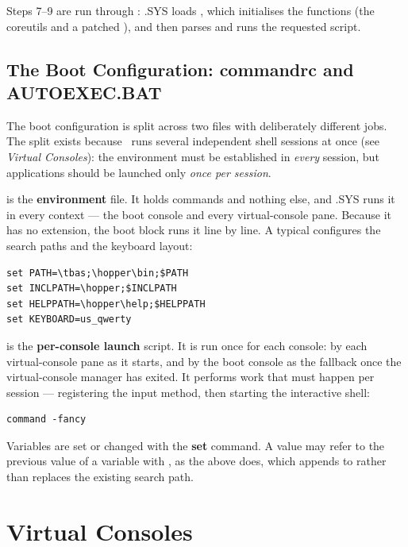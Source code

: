 Steps 7--9 are run through : \thedos.SYS loads , which initialises the  functions (the coreutils and a patched ), and then parses and runs the requested script.

\section{The Boot Configuration: commandrc and AUTOEXEC.BAT}

The boot configuration is split across two files with deliberately different jobs. The split exists because \thedos\ runs several independent shell sessions at once (see \emph{Virtual Consoles}): the environment must be established in \emph{every} session, but applications should be launched only \emph{once per session}.

 is the \textbf{environment} file. It holds  commands and nothing else, and \thedos.SYS runs it in every context --- the boot console and every virtual-console pane. Because it has no  extension, the boot block runs it line by line. A typical  configures the search paths and the keyboard layout:

\begin{lstlisting}
set PATH=\tbas;\hopper\bin;$PATH
set INCLPATH=\hopper;$INCLPATH
set HELPPATH=\hopper\help;$HELPPATH
set KEYBOARD=us_qwerty
\end{lstlisting}

 is the \textbf{per-console launch} script. It is run once for each console: by each virtual-console pane as it starts, and by the boot console as the fallback once the virtual-console manager has exited. It performs work that must happen per session --- registering the input method, then starting the interactive shell:

\begin{lstlisting}
command -fancy
\end{lstlisting}

Variables are set or changed with the \textbf{set} command. A value may refer to the previous value of a variable with , as the  above does, which appends to rather than replaces the existing search path.



\chapter{Virtual Consoles}

